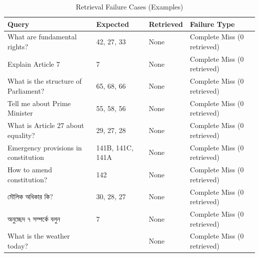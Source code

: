 \begin{table}[htbp]
\centering
\caption{Retrieval Failure Cases (Examples)}
\label{tab:retrieval_failures}
\begin{tabular}{p{}p{}p{}p{}}
\toprule
Query & Expected & Retrieved & Failure Type \\
\midrule
What are fundamental rights? & 42, 27, 33 & None & Complete Miss (0 retrieved) \\
Explain Article 7 & 7 & None & Complete Miss (0 retrieved) \\
What is the structure of Parliament? & 65, 68, 66 & None & Complete Miss (0 retrieved) \\
Tell me about Prime Minister & 55, 58, 56 & None & Complete Miss (0 retrieved) \\
What is Article 27 about equality? & 29, 27, 28 & None & Complete Miss (0 retrieved) \\
Emergency provisions in constitution & 141B, 141C, 141A & None & Complete Miss (0 retrieved) \\
How to amend constitution? & 142 & None & Complete Miss (0 retrieved) \\
মৌলিক অধিকার কি? & 30, 28, 27 & None & Complete Miss (0 retrieved) \\
অনুচ্ছেদ ৭ সম্পর্কে বলুন & 7 & None & Complete Miss (0 retrieved) \\
What is the weather today? &  & None & Complete Miss (0 retrieved) \\
\bottomrule
\end{tabular}
\end{table}
